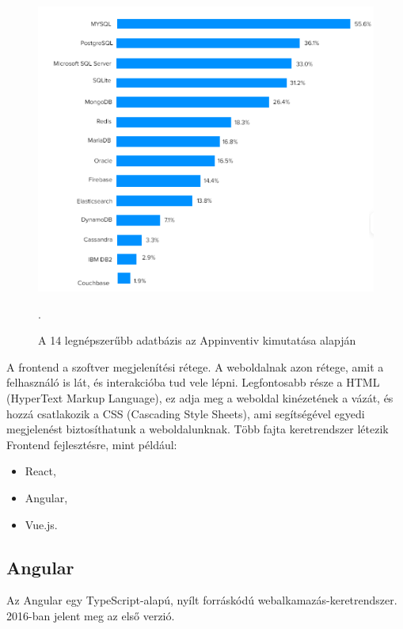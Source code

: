 \begin{figure}[h]
\centering
\includegraphics[scale=0.6]{images/top14_database.png}
\caption{A 14 legnépszerűbb adatbázis az Appinventiv kimutatása alapján \cite{databases}}.
\label{fig:Adatbázisok}
\end{figure}
\newpage


A frontend a szoftver megjelenítési rétege. A weboldalnak azon rétege, amit a felhasználó is lát, és interakcióba tud vele lépni. Legfontosabb része a HTML (HyperText Markup Language), ez adja meg a weboldal kinézetének a vázát, és hozzá csatlakozik a CSS (Cascading Style Sheets), ami segítségével egyedi megjelenést biztosíthatunk a weboldalunknak. Több fajta keretrendszer létezik Frontend fejlesztésre, mint például:

\begin{itemize}
\item React,
\item Angular,
\item Vue.js.
\end{itemize}


\subsection{Angular}

Az Angular \cite{Angular} egy TypeScript-alapú, nyílt forráskódú webalkamazás-keretrendszer. 2016-ban jelent meg az első verzió.

